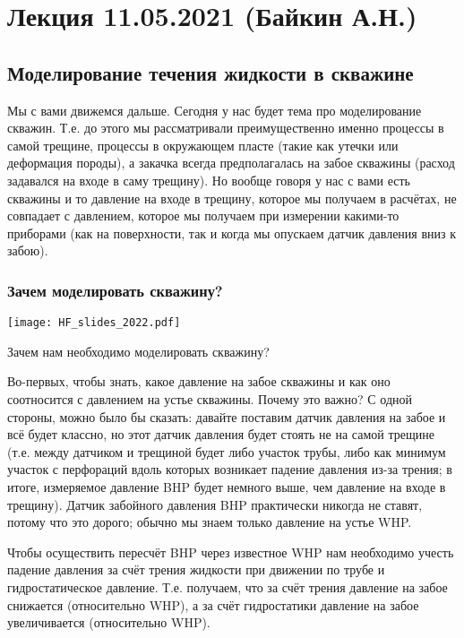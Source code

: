 \documentclass[main.tex]{subfiles}
\begin{document}

\section{Лекция 11.05.2021 (Байкин А.Н.)}

\subsection{Моделирование течения жидкости в скважине}

Мы с вами движемся дальше.
Сегодня у нас будет тема про моделирование скважин.
Т.е. до этого мы рассматривали преимущественно именно процессы в самой трещине, процессы в окружающем пласте (такие как утечки или деформация породы), а закачка всегда предполагалась на забое скважины (расход задавался на входе в саму трещину).
Но вообще говоря у нас с вами есть скважины и то давление на входе в трещину, которое мы получаем в расчётах, не совпадает с давлением, которое мы получаем при измерении какими-то приборами (как на поверхности, так и когда мы опускаем датчик давления вниз к забою).
\\

\subsubsection{Зачем моделировать скважину?}

\texttt{[image: HF\_slides\_2022.pdf]}

Зачем нам необходимо моделировать скважину?

Во-первых, чтобы знать, какое давление на забое скважины и как оно соотносится с давлением на устье скважины.
Почему это важно?
С одной стороны, можно было бы сказать: давайте поставим датчик давления на забое и всё будет классно, но этот датчик давления будет стоять не на самой трещине (т.е. между датчиком и трещиной будет либо участок трубы, либо как минимум участок с перфораций вдоль которых возникает падение давления из-за трения; в итоге, измеряемое давление BHP будет немного выше, чем давление на входе в трещину).
Датчик забойного давления BHP практически никогда не ставят, потому что это дорого; обычно мы знаем только давление на устье WHP.

Чтобы осуществить пересчёт BHP через известное WHP нам необходимо учесть падение давления за счёт трения жидкости при движении по трубе и гидростатическое давление.
Т.е. получаем, что за счёт трения давление на забое снижается (относительно WHP), а за счёт гидростатики давление на забое увеличивается (относительно WHP).
\end{document}
